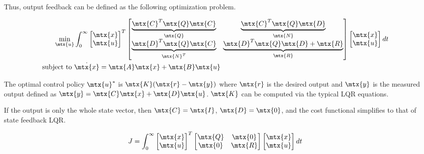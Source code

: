 Thus, output feedback can be defined as the following optimization problem.

\begin{theorem}
  \begin{align*}
    \min_{\mtx{u}} &\int_0^\infty
    \begin{bmatrix}
      \mtx{x} \\
      \mtx{u}
    \end{bmatrix}^T
    \begin{bmatrix}
      \underbrace{\mtx{C}^T\mtx{Q}\mtx{C}}_{\mtx{Q}} &
      \underbrace{\mtx{C}^T\mtx{Q}\mtx{D}}_{\mtx{N}} \\
      \underbrace{\mtx{D}^T\mtx{Q}\mtx{C}}_{\mtx{N}^T} &
      \underbrace{\mtx{D}^T\mtx{Q}\mtx{D} + \mtx{R}}_{\mtx{R}}
    \end{bmatrix}
    \begin{bmatrix}
      \mtx{x} \\
      \mtx{u}
    \end{bmatrix}
    dt \\
    \text{subject to } &\dot{\mtx{x}} = \mtx{A}\mtx{x} + \mtx{B}\mtx{u}
  \end{align*}

  The optimal control policy $\mtx{u}^*$ is $\mtx{K}(\mtx{r} - \mtx{y})$ where
  $\mtx{r}$ is the desired output and $\mtx{y}$ is the measured output defined
  as $\mtx{y} = \mtx{C}\mtx{x} + \mtx{D}\mtx{u}$. $\mtx{K}$ can be computed via
  the typical LQR equations.
\end{theorem}

If the output is only the whole state vector, then $\mtx{C} = \mtx{I}$,
$\mtx{D} = \mtx{0}$, and the cost functional simplifies to that of state
feedback LQR.

\begin{equation*}
  J = \int_0^\infty
  \begin{bmatrix}
    \mtx{x} \\
    \mtx{u}
  \end{bmatrix}^T
  \begin{bmatrix}
    \mtx{Q} & \mtx{0} \\
    \mtx{0} & \mtx{R}
  \end{bmatrix}
  \begin{bmatrix}
    \mtx{x} \\
    \mtx{u}
  \end{bmatrix}
  dt
\end{equation*}
